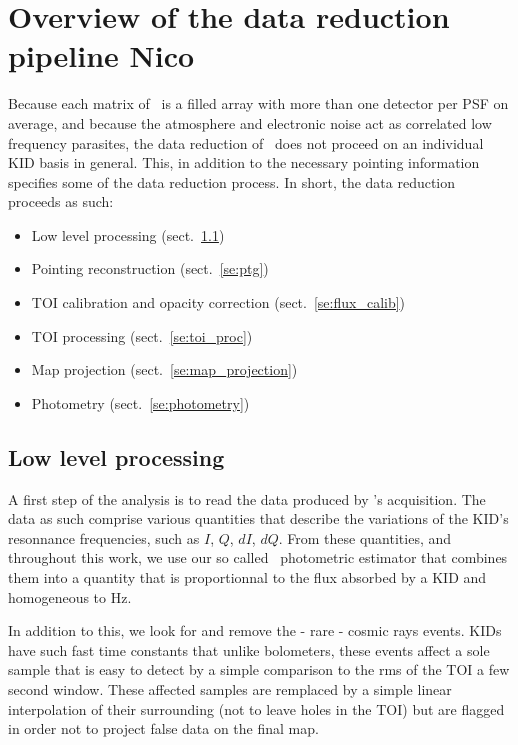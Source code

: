 

\section{Overview of the data reduction pipeline {\color{YellowGreen} Nico}}
\label{se:pipeline_overview}

Because each matrix of \nika\ is a filled array with more than one detector per
PSF on average, and because the atmosphere and electronic noise act as
correlated low frequency parasites, the data reduction of \nika\ does not
proceed on an individual KID basis in general. This, in addition to the
necessary pointing information specifies some of the data reduction
process. In short, the data reduction proceeds as such:

\begin{itemize}
\item Low level processing (sect.~\ref{se:ll_proc})
\item Pointing reconstruction (sect.~\ref{se:ptg})
\item TOI calibration and opacity correction (sect.~\ref{se:flux_calib})
\item TOI processing (sect.~\ref{se:toi_proc})
\item Map projection (sect.~\ref{se:map_projection})
\item Photometry (sect.~\ref{se:photometry})
\end{itemize}

\subsection{Low level processing}
\label{se:ll_proc}

A first step of the analysis is to read the data produced by \nika's
acquisition. The data as such comprise various quantities that describe the
variations of the KID's resonnance frequencies, such as $I$, $Q$, $dI$,
$dQ$. From these quantities, and throughout this work, we use our so called
\rf\ photometric estimator that combines them into a quantity that is
proportionnal to the flux absorbed by a KID \cite{Calvo13} and homogeneous to Hz.

In addition to this, we look for and remove the - rare - cosmic rays
events. KIDs have such fast time constants that unlike bolometers, these events
affect a sole sample that is easy to detect by a simple comparison to the rms of
the TOI a few second window. These affected samples are remplaced by a simple
linear interpolation of their surrounding (not to leave holes in the TOI) but
are flagged in order not to project false data on the final map.

